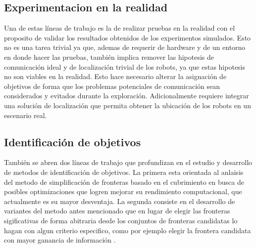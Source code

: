 \subsection{Experimentacion en la realidad}

Una de estas líneas de trabajo es la de realizar pruebas en la realidad con el
proposito de validar los resultados obtenidos de los experimentos simulados.
Esto no es una tarea trivial ya que, ademas de requerir de hardware y de un
entorno en donde hacer las pruebas, también implica remover las hipotesis de
comunicación ideal y de localización trivial de los robots, ya que estas
hipotesis no son viables en la realidad. Esto hace necesario alterar la
asignación de objetivos de forma que los problemas potenciales de comunicación
sean considerados y evitados durante la exploración. Adicionalmente requiere
integrar una solución de localización que permita obtener la ubicación de los
robots en un escenario real.

\subsection{Identificación de objetivos}




También se abren dos líneas de trabajo que profundizan en el estudio y
desarrollo de metodos de identificación de objetivos. La primera esta orientada
al anlaisis del metodo de simplificación de fronteras basado en el cubrimiento
en busca de posibles optimizaciones que logren mejorar su rendimiento
computacional, que actualmente es su mayor desventaja. La segunda consiste en
el desarrollo de variantes del metodo antes mencionado que en lugar de elegir
las fronteras sigificativas de forma abitraria desde los conjuntos de fronteras
candidatas lo hagan con algun criterio especifico, como por ejemplo elegir la
frontera candidata con mayor ganancia de información \cite{amorin2019novel}.


